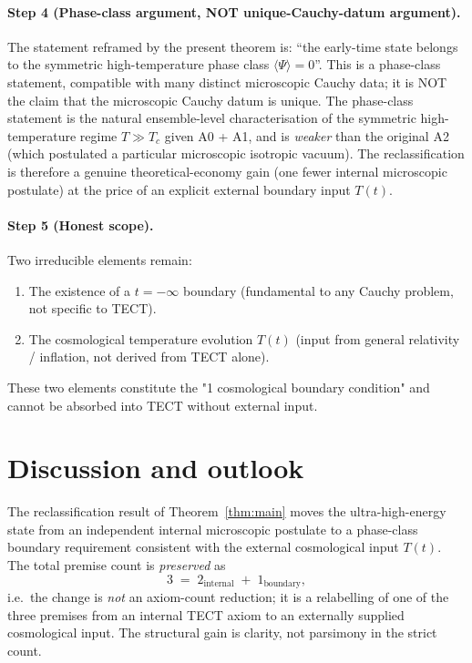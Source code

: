 \paragraph{Step 4 (Phase-class argument, NOT unique-Cauchy-datum argument).}
The statement reframed by the present theorem is: ``the early-time
state belongs to the symmetric high-temperature phase class
$\langle \Psi \rangle = 0$''. This is a phase-class statement,
compatible with many distinct microscopic Cauchy data; it is NOT the
claim that the microscopic Cauchy datum is unique. The phase-class
statement is the natural ensemble-level characterisation of the
symmetric high-temperature regime $T \gg T_c$ given A0 + A1, and is
\emph{weaker} than the original A2 (which postulated a particular
microscopic isotropic vacuum). The reclassification is therefore a
genuine theoretical-economy gain (one fewer internal microscopic
postulate) at the price of an explicit external boundary input
$T(t)$.

\paragraph{Step 5 (Honest scope).}
Two irreducible elements remain:
\begin{enumerate}
\item The existence of a $t = -\infty$ boundary (fundamental to any Cauchy
  problem, not specific to TECT).
\item The cosmological temperature evolution $T(t)$ (input from general
  relativity / inflation, not derived from TECT alone).
\end{enumerate}

These two elements constitute the "1 cosmological boundary condition" and
cannot be absorbed into TECT without external input.

\section{Discussion and outlook}\label{sec:discussion}

The reclassification result of Theorem~\ref{thm:main} moves the
ultra-high-energy state from an independent internal microscopic
postulate to a phase-class boundary requirement consistent with the
external cosmological input $T(t)$. The total premise count is
\emph{preserved} as
\[
  3 \;=\; 2_{\text{internal}} \;+\; 1_{\text{boundary}},
\]
i.e.\ the change is \emph{not} an axiom-count reduction; it is a
relabelling of one of the three premises from an internal TECT axiom
to an externally supplied cosmological input. The structural gain is
clarity, not parsimony in the strict count.

